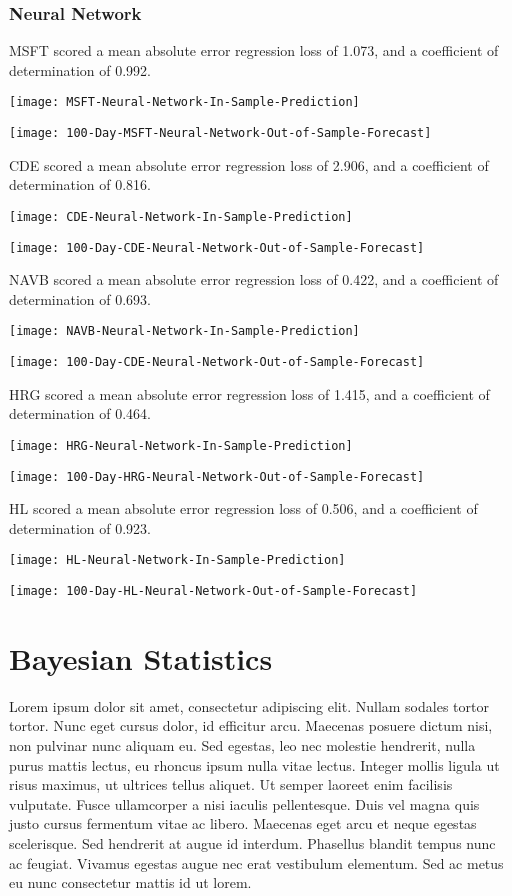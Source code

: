 \subsubsection{Neural Network}
MSFT scored a mean absolute error regression loss of 1.073, and a coefficient of determination of 0.992.

\texttt{[image: MSFT-Neural-Network-In-Sample-Prediction]}

\texttt{[image: 100-Day-MSFT-Neural-Network-Out-of-Sample-Forecast]}

CDE scored a mean absolute error regression loss of 2.906, and a coefficient of determination of 0.816.

\texttt{[image: CDE-Neural-Network-In-Sample-Prediction]}

\texttt{[image: 100-Day-CDE-Neural-Network-Out-of-Sample-Forecast]}

NAVB scored a mean absolute error regression loss of 0.422, and a coefficient of determination of 0.693.

\texttt{[image: NAVB-Neural-Network-In-Sample-Prediction]}

\texttt{[image: 100-Day-CDE-Neural-Network-Out-of-Sample-Forecast]}

HRG scored a mean absolute error regression loss of 1.415, and a coefficient of determination of 0.464.

\texttt{[image: HRG-Neural-Network-In-Sample-Prediction]}

\texttt{[image: 100-Day-HRG-Neural-Network-Out-of-Sample-Forecast]}

HL scored a mean absolute error regression loss of 0.506, and a coefficient of determination of 0.923.

\texttt{[image: HL-Neural-Network-In-Sample-Prediction]}

\texttt{[image: 100-Day-HL-Neural-Network-Out-of-Sample-Forecast]}

\section{Bayesian Statistics}
Lorem ipsum dolor sit amet, consectetur adipiscing elit. Nullam sodales tortor tortor. Nunc eget cursus dolor, id efficitur arcu. Maecenas posuere dictum nisi, non pulvinar nunc aliquam eu. Sed egestas, leo nec molestie hendrerit, nulla purus mattis lectus, eu rhoncus ipsum nulla vitae lectus. Integer mollis ligula ut risus maximus, ut ultrices tellus aliquet. Ut semper laoreet enim facilisis vulputate. Fusce ullamcorper a nisi iaculis pellentesque. Duis vel magna quis justo cursus fermentum vitae ac libero. Maecenas eget arcu et neque egestas scelerisque. Sed hendrerit at augue id interdum. Phasellus blandit tempus nunc ac feugiat. Vivamus egestas augue nec erat vestibulum elementum. Sed ac metus eu nunc consectetur mattis id ut lorem.

